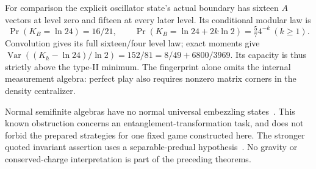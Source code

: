 For comparison the explicit oscillator state's actual boundary has sixteen $A$ vectors at level zero and fifteen at every later level. Its conditional modular law is
\[
 \Pr(K_B=\ln24)=16/21,\qquad
 \Pr(K_B=\ln24+2k\ln2)=\tfrac57 4^{-k}\ (k\ge1).
\]
Convolution gives its full sixteen/four level law; exact moments give $\operatorname{Var}((K_h-\ln24)/\ln2)=152/81=8/49+6800/3969$. Its capacity is thus strictly above the type-II minimum. The fingerprint alone omits the internal measurement algebra: perfect play also requires nonzero matrix corners in the density centralizer.

Normal semifinite algebras have no normal universal embezzling states~\cite[Corollary 54, arXiv version 4]{vLSWWembezzle}. This known obstruction concerns an entanglement-transformation task, and does not forbid the prepared strategies for one fixed game constructed here. The stronger quoted invariant assertion uses a separable-predual hypothesis~\cite[Corollary 55]{vLSWWembezzle}. No gravity or conserved-charge interpretation is part of the preceding theorems.
